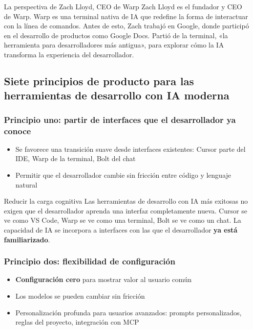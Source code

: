 \documentclass[a4paper]{article}
\begin{document}
\begin{knowledgebox}{La perspectiva de Zach Lloyd, CEO de Warp}
Zach Lloyd es el fundador y CEO de Warp. Warp es una terminal nativa de IA que redefine la forma de interactuar con la línea de comandos. Antes de esto, Zach trabajó en Google, donde participó en el desarrollo de productos como Google Docs. Partió de la terminal, «la herramienta para desarrolladores más antigua», para explorar cómo la IA transforma la experiencia del desarrollador.
\end{knowledgebox}

\subsection{Siete principios de producto para las herramientas de desarrollo con IA moderna}

\subsubsection{Principio uno: partir de interfaces que el desarrollador ya conoce}

\begin{itemize}
    \item Se favorece una transición suave desde interfaces existentes: Cursor parte del IDE, Warp de la terminal, Bolt del chat
    \item Permitir que el desarrollador cambie sin fricción entre código y lenguaje natural
\end{itemize}

\begin{importantbox}{Reducir la carga cognitiva}
Las herramientas de desarrollo con IA más exitosas no exigen que el desarrollador aprenda una interfaz completamente nueva. Cursor se ve como VS Code, Warp se ve como una terminal, Bolt se ve como un chat. La capacidad de IA se incorpora a interfaces con las que el desarrollador \textbf{ya está familiarizado}.
\end{importantbox}

\subsubsection{Principio dos: flexibilidad de configuración}

\begin{itemize}
    \item \textbf{Configuración cero} para mostrar valor al usuario común
    \item Los modelos se pueden cambiar sin fricción
    \item Personalización profunda para usuarios avanzados: prompts personalizados, reglas del proyecto, integración con MCP
\end{itemize}
\end{document}
